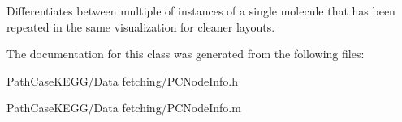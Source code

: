 Differentiates between multiple of instances of a single molecule that has been repeated in the same visualization for cleaner layouts. 



The documentation for this class was generated from the following files:\begin{DoxyCompactItemize}
\item 
PathCaseKEGG/Data fetching/PCNodeInfo.h\item 
PathCaseKEGG/Data fetching/PCNodeInfo.m\end{DoxyCompactItemize}
